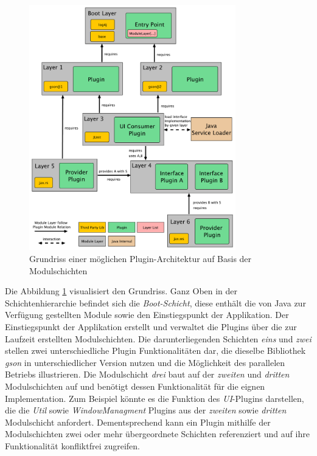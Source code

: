 	\begin{figure}[t]
		   \centering
		   \captionsetup{justification=centering}
		   \includegraphics[width=0.8\textwidth]{material/images/ModulLayerDepsDraw.pdf}
		   \caption{Grundriss einer möglichen Plugin-Architektur auf Basis der Modulschichten}
		   \label{fig:ModSchichtKonzept}
	\end{figure}
\newpage	
	Die Abbildung \ref{fig:ModSchichtKonzept} visualisiert den Grundriss. Ganz Oben in der Schichtenhierarchie befindet sich die \textit{Boot-Schicht}, diese enthält die von Java zur Verfügung gestellten Module sowie den Einstiegspunkt der Applikation. Der Einstiegspunkt der Applikation erstellt und verwaltet die Plugins über die zur Laufzeit erstellten Modulschichten. Die darunterliegenden Schichten \textit{eins} und \textit{zwei} stellen zwei unterschiedliche Plugin Funktionalitäten dar, die dieselbe Bibliothek \textit{gson} in unterschiedlicher Version nutzen und die Möglichkeit des parallelen Betriebs illustrieren. Die Modulschicht \textit{drei} baut auf der \textit{zweiten} und \textit{dritten} Modulschichten auf und benötigt dessen Funktionalität für die eignen Implementation. Zum Beispiel könnte es die Funktion des \textit{UI}-Plugins darstellen, die die \textit{Util} sowie \textit{WindowManagment} Plugins aus der \textit{zweiten} sowie \textit{dritten} Modulschicht anfordert. Dementsprechend kann ein Plugin mithilfe der Modulschichten zwei oder mehr übergeordnete Schichten referenziert und auf ihre Funktionalität konfliktfrei zugreifen.\newline
